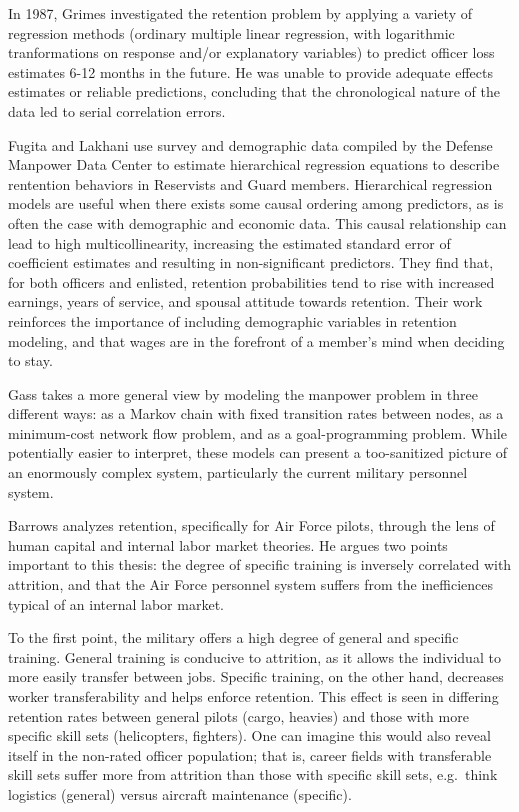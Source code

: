 \documentclass[12pt,letterpaper,toc=flat,oneside]{report}
\theoremstyle{definition}
\theoremstyle{definition}
\theoremstyle{definition}
\theoremstyle{remark}
\begin{document}
In 1987, Grimes \cite{grimes-1987} investigated the retention problem by
applying a variety of regression methods (ordinary multiple linear
regression, with logarithmic tranformations on response and/or
explanatory variables) to predict officer loss estimates 6-12 months in
the future. He was unable to provide adequate effects estimates or
reliable predictions, concluding that the chronological nature of the
data led to serial correlation errors.

Fugita and Lakhani \cite{fugita-lakhani-1991} use survey and demographic
data compiled by the Defense Manpower Data Center to estimate
hierarchical regression equations to describe rentention behaviors in
Reservists and Guard members. Hierarchical regression models are useful
when there exists some causal ordering among predictors, as is often the
case with demographic and economic data. This causal relationship can
lead to high multicollinearity, increasing the estimated standard error
of coefficient estimates and resulting in non-significant predictors.
They find that, for both officers and enlisted, retention probabilities
tend to rise with increased earnings, years of service, and spousal
attitude towards retention. Their work reinforces the importance of
including demographic variables in retention modeling, and that wages
are in the forefront of a member's mind when deciding to stay.

Gass \cite{gass-1991} takes a more general view by modeling the manpower
problem in three different ways: as a Markov chain with fixed transition
rates between nodes, as a minimum-cost network flow problem, and as a
goal-programming problem. While potentially easier to interpret, these
models can present a too-sanitized picture of an enormously complex
system, particularly the current military personnel system.

Barrows \cite{barrows-1993} analyzes retention, specifically for Air
Force pilots, through the lens of human capital and internal labor
market theories. He argues two points important to this thesis: the
degree of specific training is inversely correlated with attrition, and
that the Air Force personnel system suffers from the inefficiences
typical of an internal labor market.

To the first point, the military offers a high degree of general and
specific training. General training is conducive to attrition, as it
allows the individual to more easily transfer between jobs. Specific
training, on the other hand, decreases worker transferability and helps
enforce retention. This effect is seen in differing retention rates
between general pilots (cargo, heavies) and those with more specific
skill sets (helicopters, fighters). One can imagine this would also
reveal itself in the non-rated officer population; that is, career
fields with transferable skill sets suffer more from attrition than
those with specific skill sets, e.g.~think logistics (general) versus
aircraft maintenance (specific).
\end{document}
